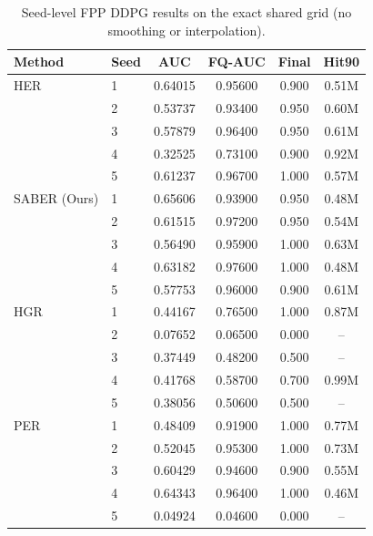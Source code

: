 \begin{table}[t]
\centering
\small
\setlength{\tabcolsep}{1pt}
\begin{tabular}{llcccc}
\toprule
Method & Seed & AUC & FQ-AUC & Final & Hit90 \\
\midrule
HER & 1 & 0.64015 & 0.95600 & 0.900 & 0.51M \\
 & 2 & 0.53737 & 0.93400 & 0.950 & 0.60M \\
 & 3 & 0.57879 & 0.96400 & 0.950 & 0.61M \\
 & 4 & 0.32525 & 0.73100 & 0.900 & 0.92M \\
 & 5 & 0.61237 & 0.96700 & 1.000 & 0.57M \\
\addlinespace[1pt]
SABER (Ours) & 1 & 0.65606 & 0.93900 & 0.950 & 0.48M \\
 & 2 & 0.61515 & 0.97200 & 0.950 & 0.54M \\
 & 3 & 0.56490 & 0.95900 & 1.000 & 0.63M \\
 & 4 & 0.63182 & 0.97600 & 1.000 & 0.48M \\
 & 5 & 0.57753 & 0.96000 & 0.900 & 0.61M \\
\addlinespace[1pt]
HGR & 1 & 0.44167 & 0.76500 & 1.000 & 0.87M \\
 & 2 & 0.07652 & 0.06500 & 0.000 & -- \\
 & 3 & 0.37449 & 0.48200 & 0.500 & -- \\
 & 4 & 0.41768 & 0.58700 & 0.700 & 0.99M \\
 & 5 & 0.38056 & 0.50600 & 0.500 & -- \\
\addlinespace[1pt]
PER & 1 & 0.48409 & 0.91900 & 1.000 & 0.77M \\
 & 2 & 0.52045 & 0.95300 & 1.000 & 0.73M \\
 & 3 & 0.60429 & 0.94600 & 0.900 & 0.55M \\
 & 4 & 0.64343 & 0.96400 & 1.000 & 0.46M \\
 & 5 & 0.04924 & 0.04600 & 0.000 & -- \\
\bottomrule
\end{tabular}
\caption{Seed-level FPP DDPG results on the exact shared grid (no smoothing or interpolation).}
\label{tab:supp-seeds-fpp-ddpg}
\end{table}
